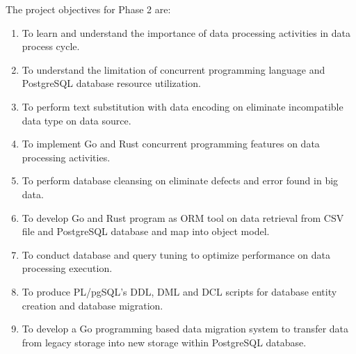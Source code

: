The project objectives for Phase 2 are:
\begin{enumerate}[topsep=0pt,itemsep=-1ex,partopsep=1ex,parsep=1.5ex]
	
	\item To learn and understand the importance of data processing activities in data process cycle.
	\item To understand the limitation of concurrent programming language and PostgreSQL database resource utilization. 
	\item To perform text substitution with data encoding on eliminate incompatible data type on data source. 
	\item To implement Go and Rust concurrent programming features on data processing activities. 
	\item To perform database cleansing on eliminate defects and error found in big data. 
	\item To develop Go and Rust program as ORM tool on data retrieval from CSV file and PostgreSQL database and map into object model. 
	\item To conduct database and query tuning to optimize performance on data processing execution. 
	\item To produce PL/pgSQL's DDL, DML and DCL scripts for database entity creation and database migration. 
	\item To develop a Go programming based data migration system to transfer data from legacy storage into new storage within PostgreSQL database. 
	
\end{enumerate}

